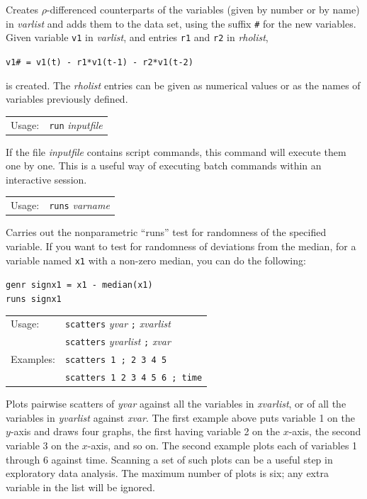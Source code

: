 \documentclass{article}
\begin{document}
{Creates $\rho$-differenced counterparts of the variables (given by
number or by name) in \textit{varlist} and adds them to the data set,
using the suffix \texttt{\#} for the new variables.  Given variable
\texttt{v1} in \textit{varlist}, and entries \texttt{r1} and
\texttt{r2} in \textit{rholist},

\texttt{v1\# = v1(t) - r1*v1(t-1) - r2*v1(t-2)}

is created.  The \textit{rholist} entries can be given as numerical
values or as the names of variables previously defined.


\begin{tabular}{ll}
Usage:  & \texttt{run} \textit{inputfile}
\end{tabular}

If the file \textit{inputfile} contains script commands, this command
will execute them one by one.  This is a useful way of executing batch
commands within an interactive session.


\begin{tabular}{ll}
Usage:  & \texttt{runs} \textit{varname}
\end{tabular}

Carries out the nonparametric ``runs'' test for randomness of the
specified variable.  If you want to test for randomness of deviations
from the median, for a variable named \texttt{x1} with a non-zero
median, you can do the following:

\texttt{genr signx1 = x1 - median(x1)}\\
\texttt{runs signx1}


\begin{tabular}{ll}
Usage:  &        \texttt{scatters} \textit{yvar} 
                         \texttt{;} \textit{xvarlist}\\
        &        \texttt{scatters} \textit{yvarlist} \texttt{;} \textit{xvar}\\
Examples:  &     \texttt{scatters 1 ; 2 3 4 5}\\
           &     \texttt{scatters 1 2 3 4 5 6 ; time}
\end{tabular}

Plots pairwise scatters of \textit{yvar} against all the variables in
\textit{xvarlist}, or of all the variables in \textit{yvarlist}
against \textit{xvar}.  The first example above puts variable 1 on the
$y$-axis and draws four graphs, the first having variable 2 on the
$x$-axis, the second variable 3 on the $x$-axis, and so on.  The
second example plots each of variables 1 through 6 against time.
Scanning a set of such plots can be a useful step in exploratory data
analysis.  The maximum number of plots is six; any extra variable in
the list will be ignored.

}
\end{document}
